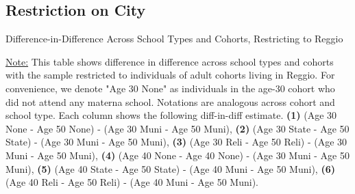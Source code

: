 \documentclass[11pt]{article}
\begin{document}
\subsection{Restriction on City}
\begin{table}[H]
\begin{center}
	\caption{Difference-in-Difference Across School Types and Cohorts, Restricting to Reggio}
	\scalebox{0.80}{
		}
\end{center}
\footnotesize
\underline{Note:} This table shows difference in difference across school types and cohorts with the sample restricted to individuals of adult cohorts living in Reggio. For convenience, we denote "Age 30 None" as individuals in the age-30 cohort who did not attend any materna school. Notations are analogous across cohort and school type. Each column shows the following diff-in-diff estimate. \textbf{(1)} (Age 30 None - Age 50 None) - (Age 30 Muni - Age 50 Muni), \textbf{(2)} (Age 30 State - Age 50 State) - (Age 30 Muni - Age 50 Muni), \textbf{(3)} (Age 30 Reli - Age 50 Reli) - (Age 30 Muni - Age 50 Muni), \textbf{(4)} (Age 40 None - Age 40 None) - (Age 30 Muni - Age 50 Muni),  \textbf{(5)} (Age 40 State - Age 50 State) - (Age 40 Muni - Age 50 Muni), \textbf{(6)} (Age 40 Reli - Age 50 Reli) - (Age 40 Muni - Age 50 Muni). 
\end{table}
\end{document}
